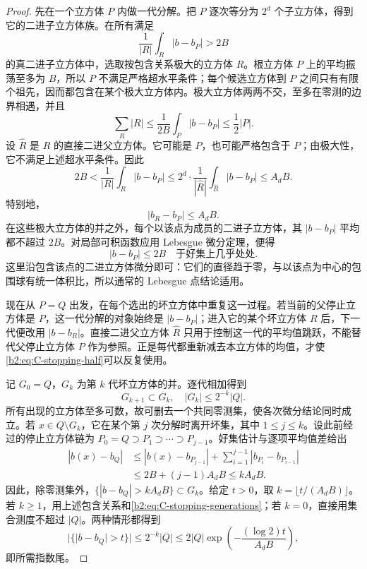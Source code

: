 \begin{proof}
先在一个立方体 \(P\) 内做一代分解。把 \(P\) 逐次等分为 \(2^d\) 个子立方体，得到它的二进子立方体族。在所有满足
\[
 \frac1{|R|}\int_R|b-b_P|>2B
\]
的真二进子立方体中，选取按包含关系极大的立方体 \(R\)。根立方体 \(P\) 上的平均振荡至多为 \(B\)，所以 \(P\) 不满足严格超水平条件；每个候选立方体到 \(P\) 之间只有有限个祖先，因而都包含在某个极大立方体内。极大立方体两两不交，至多在零测的边界相遇，并且
\begin{equation}\label{b2:eq:C-stopping-half}
 \sum_R|R|
 \leq\frac1{2B}\int_P|b-b_P|
 \leq\frac12|P|.
\end{equation}
设 \(\widehat R\) 是 \(R\) 的直接二进父立方体。它可能是 \(P\)，也可能严格包含于 \(P\)；由极大性，它不满足上述超水平条件。因此
\[
 2B<\frac1{|R|}\int_R|b-b_P|
 \leq2^d\cdot\frac1{|\widehat R|}
                 \int_{\widehat R}|b-b_P|
 \leq A_dB.
\]
特别地，
\begin{equation}\label{b2:eq:C-stopping-mean-jump}
 |b_R-b_P|\leq A_dB.
\end{equation}
在这些极大立方体的并之外，每个以该点为成员的二进子立方体，其 \(|b-b_P|\) 平均都不超过 \(2B\)。对局部可积函数应用 Lebesgue 微分定理，便得
\begin{equation}\label{b2:eq:C-stopping-good}
 |b-b_P|\leq2B
 \quad\text{于好集上几乎处处}.
\end{equation}
这里沿包含该点的二进立方体微分即可：它们的直径趋于零，与以该点为中心的包围球有统一体积比，所以通常的 Lebesgue 点结论适用。

现在从 \(P=Q\) 出发，在每个选出的坏立方体中重复这一过程。若当前的父停止立方体是 \(P\)，这一代分解的对象始终是 \(|b-b_P|\)；进入它的某个坏立方体 \(R\) 后，下一代便改用 \(|b-b_R|\)。直接二进父立方体 \(\widehat R\) 只用于控制这一代的平均值跳跃，不能替代父停止立方体 \(P\) 作为参照。正是每代都重新减去本立方体的均值，才使\eqref{b2:eq:C-stopping-half}可以反复使用。

记 \(G_0=Q\)，\(G_k\) 为第 \(k\) 代坏立方体的并。逐代相加得到
\begin{equation}\label{b2:eq:C-stopping-generations}
 G_{k+1}\subset G_k,\quad |G_k|\leq2^{-k}|Q|.
\end{equation}
所有出现的立方体至多可数，故可删去一个共同零测集，使各次微分结论同时成立。若 \(x\in Q\setminus G_k\)，它在某个第 \(j\) 次分解时离开坏集，其中 \(1\leq j\leq k\)。设此前经过的停止立方体链为
\(P_0=Q\supset P_1\supset\cdots\supset P_{j-1}\)。好集估计与逐项平均值差给出
\[
 \begin{aligned}
 |b(x)-b_Q|
 &\leq |b(x)-b_{P_{j-1}}|
        +\sum_{i=1}^{j-1}|b_{P_i}-b_{P_{i-1}}|\\
 &\leq2B+(j-1)A_dB
 \leq kA_dB.
 \end{aligned}
\]
因此，除零测集外，\(\{|b-b_Q|>kA_dB\}\subset G_k\)。给定 \(t>0\)，取
\(k=\lfloor t/(A_dB)\rfloor\)。若 \(k\geq1\)，用上述包含关系和\eqref{b2:eq:C-stopping-generations}；若 \(k=0\)，直接用集合测度不超过 \(|Q|\)。两种情形都得到
\[
 |\{|b-b_Q|>t\}|
 \leq2^{-k}|Q|
 \leq2|Q|\exp\left(-\frac{(\log2)t}{A_dB}\right),
\]
即所需指数尾。


\end{proof}
